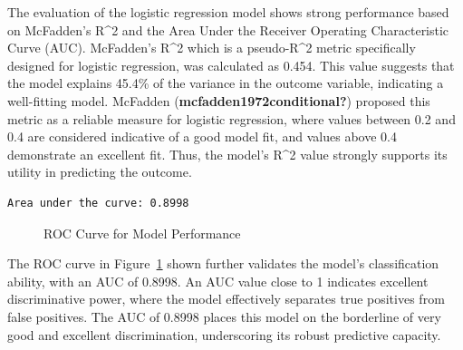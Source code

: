 \documentclass[
  letterpaper,
  DIV=11,
  numbers=noendperiod]{scrartcl}
\begin{document}
The evaluation of the logistic regression model shows strong performance
based on McFadden's R\^{}2 and the Area Under the Receiver Operating
Characteristic Curve (AUC). McFadden's R\^{}2 which is a pseudo-R\^{}2
metric specifically designed for logistic regression, was calculated as
0.454. This value suggests that the model explains 45.4\% of the
variance in the outcome variable, indicating a well-fitting model.
McFadden (\textbf{mcfadden1972conditional?}) proposed this metric as a
reliable measure for logistic regression, where values between 0.2 and
0.4 are considered indicative of a good model fit, and values above 0.4
demonstrate an excellent fit. Thus, the model's R\^{}2 value strongly
supports its utility in predicting the outcome.

\begin{verbatim}
Area under the curve: 0.8998
\end{verbatim}

\begin{figure}


\caption{\label{fig-roc}ROC Curve for Model Performance}

\end{figure}%

The ROC curve in Figure~\ref{fig-roc} shown further validates the
model's classification ability, with an AUC of 0.8998. An AUC value
close to 1 indicates excellent discriminative power, where the model
effectively separates true positives from false positives. The AUC of
0.8998 places this model on the borderline of very good and excellent
discrimination, underscoring its robust predictive capacity.
\end{document}
